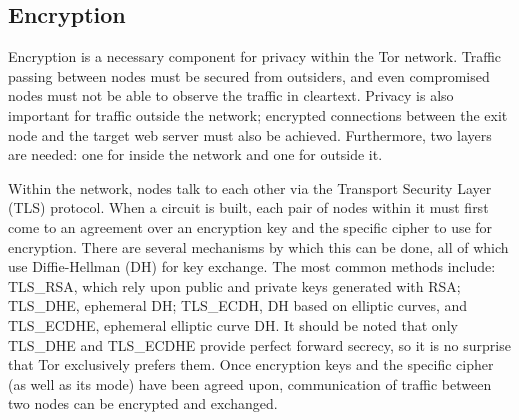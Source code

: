 \documentclass[journal]{IEEEtran}
\begin{document}
\subsection{Encryption}

Encryption is a necessary component for privacy within the Tor network. Traffic passing between nodes must be secured from outsiders, and even compromised nodes must not be able to observe the traffic in cleartext. Privacy is also important for traffic outside the network; encrypted connections between the exit node and the target web server must also be achieved. Furthermore, two layers are needed: one for inside the network and one for outside it.

Within the network, nodes talk to each other via the Transport Security Layer (TLS) protocol. When a circuit is built, each pair of nodes within it must first come to an agreement over an encryption key and the specific cipher to use for encryption. There are several mechanisms by which this can be done, all of which use Diffie-Hellman (DH) for key exchange. The most common methods include: TLS\_RSA, which rely upon public and private keys generated with RSA; TLS\_DHE, ephemeral DH; TLS\_ECDH, DH based on elliptic curves, and TLS\_ECDHE, ephemeral elliptic curve DH. It should be noted that only TLS\_DHE and TLS\_ECDHE provide perfect forward secrecy, so it is no surprise that Tor exclusively prefers them. Once encryption keys and the specific cipher (as well as its mode) have been agreed upon, communication of traffic between two nodes can be encrypted and exchanged.

\end{document}
